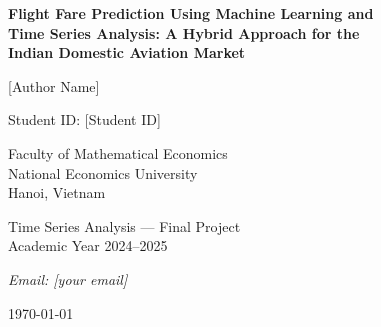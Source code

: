 \documentclass[12pt, a4paper]{article}
\begin{document}

\begin{titlepage}
\centering
\vspace*{2cm}
{\Large\bfseries Flight Fare Prediction Using Machine Learning and\\[6pt]
Time Series Analysis: A Hybrid Approach for the\\[6pt]
Indian Domestic Aviation Market\par}
\vspace{1.5cm}
{\large [Author Name]\par}
{\normalsize Student ID: [Student ID]\par}
\vspace{0.5cm}
{\normalsize Faculty of Mathematical Economics\\
National Economics University\\
Hanoi, Vietnam\par}
\vspace{0.5cm}
{\normalsize Time Series Analysis — Final Project\\
Academic Year 2024--2025\par}
\vspace{1.5cm}
{\normalsize\textit{Email: [your email]}\par}
\vfill
{\normalsize\today\par}
\end{titlepage}
\end{document}
